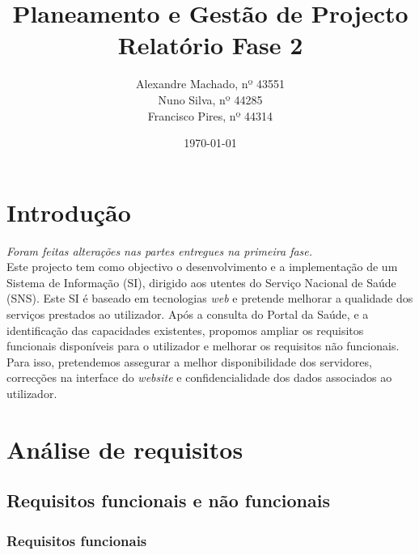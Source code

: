 \documentclass[12pt, a4paper, twoside]{report} %
\begin{document}
\title{%
	\textbf{Planeamento e Gestão de Projecto}\\ 
	\large Relatório Fase 2
}

\author{%
Alexandre Machado, nº 43551 \\
Nuno Silva, nº 44285 \\
Francisco Pires, nº 44314 \\
}

\date{\today}
\maketitle
\tableofcontents

\chapter{Introdução}

\textit{Foram feitas alterações nas partes entregues na primeira fase.} \\


Este projecto tem como objectivo o desenvolvimento e a implementação de um Sistema de Informação (SI), dirigido aos utentes do Serviço Nacional de Saúde (SNS). 
Este SI é baseado em tecnologias \textit{web} e pretende melhorar a qualidade dos serviços prestados ao utilizador. 
Após a consulta do Portal da Saúde, e a identificação das capacidades existentes, propomos ampliar os requisitos funcionais disponíveis para o utilizador e melhorar os requisitos não funcionais. 
Para isso, pretendemos assegurar a melhor disponibilidade dos servidores, correcções na interface do \textit{website} e confidencialidade dos dados associados ao utilizador.


\chapter{Análise de requisitos}

\section{Requisitos funcionais e não funcionais}

\subsection{Requisitos funcionais}
\end{document}
